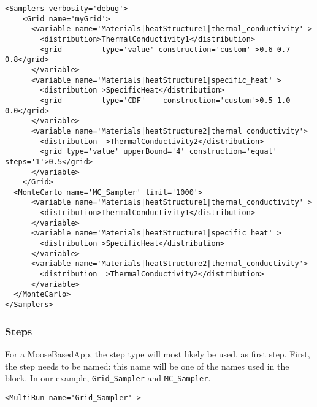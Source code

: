 \begin{lstlisting}[style=XML,morekeywords={name,type,construction,lowerBound,steps,limit,initial_seed}]
<Samplers verbosity='debug'>
    <Grid name='myGrid'>
      <variable name='Materials|heatStructure1|thermal_conductivity' >
        <distribution>ThermalConductivity1</distribution>
        <grid         type='value' construction='custom' >0.6 0.7 0.8</grid>
      </variable>
      <variable name='Materials|heatStructure1|specific_heat' >
        <distribution >SpecificHeat</distribution>
        <grid         type='CDF'    construction='custom'>0.5 1.0 0.0</grid>
      </variable>
      <variable name='Materials|heatStructure2|thermal_conductivity'>
        <distribution  >ThermalConductivity2</distribution>
        <grid type='value' upperBound='4' construction='equal' steps='1'>0.5</grid>
      </variable>
    </Grid>
  <MonteCarlo name='MC_Sampler' limit='1000'>
      <variable name='Materials|heatStructure1|thermal_conductivity' >
        <distribution>ThermalConductivity1</distribution>
      </variable>
      <variable name='Materials|heatStructure1|specific_heat' >
        <distribution >SpecificHeat</distribution>
      </variable>
      <variable name='Materials|heatStructure2|thermal_conductivity'>
        <distribution  >ThermalConductivity2</distribution>
      </variable>
  </MonteCarlo>
</Samplers>
\end{lstlisting}
\subsubsection{Steps}
For a MooseBasedApp, the  step type will most likely be
used, as first step.
%
First, the step needs to be named: this name will be one of the names used in
the  block.
%
In our example, \texttt{Grid\_Sampler} and \texttt{MC\_Sampler}.
%
\begin{lstlisting}[style=XML,morekeywords={name,debug,re-seeding}]
     <MultiRun name='Grid_Sampler' >
\end{lstlisting}

